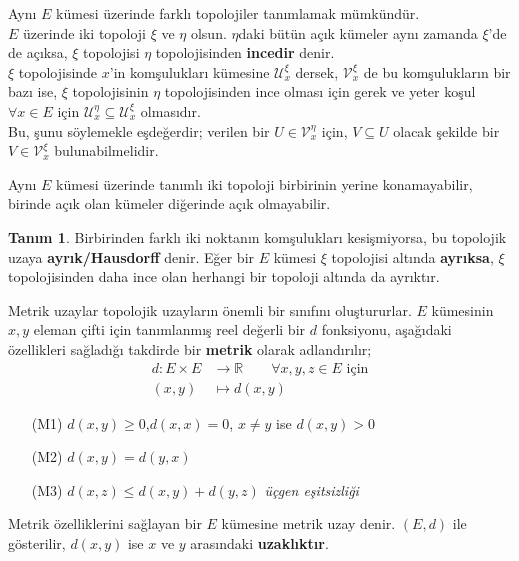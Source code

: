 \documentclass[11pt]{article}
\theoremstyle{plain}
\theoremstyle{definition}
\newtheorem{definition}{Tanım}
\theoremstyle{remark}
\numberwithin{equation}{section}
\renewcommand{\%}{{\small \%}}
\begin{document}
Aynı $E$ kümesi üzerinde farklı topolojiler tanımlamak mümkündür.\\
$E$ üzerinde iki topoloji $\xi$ ve $\eta$ olsun. $\eta$daki bütün açık kümeler aynı zamanda $\xi$'de de açıksa, $\xi$ topolojisi $\eta$ topolojisinden \textbf{incedir} denir.\\
$\xi$ topolojisinde $x$'in komşulukları kümesine $\mathscr{U}_{x}^{\xi}$ dersek, $\mathscr{V}_{x}^{\xi}$ de bu komşulukların bir bazı ise, $\xi$ topolojisinin $\eta$ topolojisinden ince olması için gerek ve yeter koşul $\forall x\in E$ için $\mathscr{U}_{x}^{\eta}\subseteq\mathscr{U}_{x}^{\xi}$ olmasıdır.\\
Bu, şunu söylemekle eşdeğerdir; verilen bir $U\in \mathscr{V}_{x}^{\eta}$ için, $V\subseteq U$ olacak şekilde bir $V\in\mathscr{V}_{x}^{\xi}$ bulunabilmelidir.

Aynı $E$ kümesi üzerinde tanımlı iki topoloji birbirinin yerine konamayabilir, birinde açık olan kümeler diğerinde açık olmayabilir.

\begin{definition}
Birbirinden farklı iki noktanın komşulukları kesişmiyorsa, bu topolojik uzaya \textbf{ayrık/Hausdorff} denir. Eğer bir $E$ kümesi $\xi$ topolojisi altında \textbf{ayrıksa}, $\xi$ topolojisinden daha ince olan herhangi bir topoloji altında da ayrıktır.

Metrik uzaylar topolojik uzayların önemli bir sınıfını oluştururlar. $E$ kümesinin $x,y$ eleman çifti için tanımlanmış reel değerli bir $d$ fonksiyonu, aşağıdaki özellikleri sağladığı takdirde bir \textbf{metrik} olarak adlandırılır;
\begin{align*}
d: E\times E &\longrightarrow \mathbb{R}\qquad \forall x,y,z\in E \text{ için}\\
(x,y)&\longmapsto d\left(x,y\right)
\end{align*}

\begin{itemize}
 \item[(M1)] $d\left(x,y\right)\geq 0$,\quad$d\left(x,x\right)=0$, \quad$x\neq y$ ise $d\left(x,y\right)>0$
 \item[(M2)] $d\left(x,y\right)=d\left(y,x\right)$
 \item[(M3)] $d\left(x,z\right)\leq d\left(x,y\right)+d\left(y,z\right)$ \emph{üçgen eşitsizliği}\newpage
\end{itemize}
\end{definition}

Metrik özelliklerini sağlayan bir $E$ kümesine metrik uzay denir. $\left(E,d\right)$ ile gösterilir, $d\left(x,y\right)$ ise $x$ ve $y$ arasındaki \textbf{uzaklıktır}.
\end{document}
